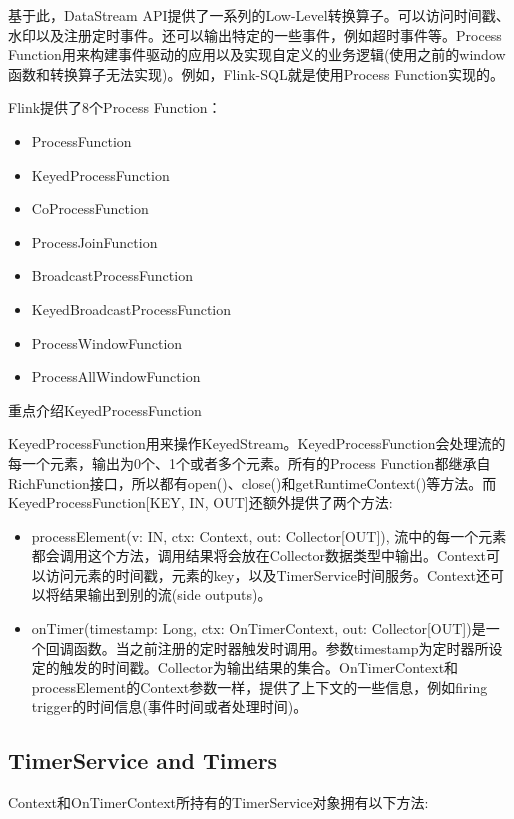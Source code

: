 \documentclass[oneside]{ctexbook}
\begin{document}
基于此，DataStream API提供了一系列的Low-Level转换算子。可以访问时间戳、水印以及注册定时事件。还可以输出特定的一些事件，例如超时事件等。Process Function用来构建事件驱动的应用以及实现自定义的业务逻辑(使用之前的window函数和转换算子无法实现)。例如，Flink-SQL就是使用Process Function实现的。

Flink提供了8个Process Function：

\begin{itemize}
\item ProcessFunction
\item KeyedProcessFunction
\item CoProcessFunction
\item ProcessJoinFunction
\item BroadcastProcessFunction
\item KeyedBroadcastProcessFunction
\item ProcessWindowFunction
\item ProcessAllWindowFunction
\end{itemize}

重点介绍KeyedProcessFunction

KeyedProcessFunction用来操作KeyedStream。KeyedProcessFunction会处理流的每一个元素，输出为0个、1个或者多个元素。所有的Process Function都继承自RichFunction接口，所以都有open()、close()和getRuntimeContext()等方法。而KeyedProcessFunction[KEY, IN, OUT]还额外提供了两个方法:

\begin{itemize}
\item processElement(v: IN, ctx: Context, out: Collector[OUT]), 流中的每一个元素都会调用这个方法，调用结果将会放在Collector数据类型中输出。Context可以访问元素的时间戳，元素的key，以及TimerService时间服务。Context还可以将结果输出到别的流(side outputs)。
\item onTimer(timestamp: Long, ctx: OnTimerContext, out: Collector[OUT])是一个回调函数。当之前注册的定时器触发时调用。参数timestamp为定时器所设定的触发的时间戳。Collector为输出结果的集合。OnTimerContext和processElement的Context参数一样，提供了上下文的一些信息，例如firing trigger的时间信息(事件时间或者处理时间)。
\end{itemize}

\subsection{TimerService and Timers}

Context和OnTimerContext所持有的TimerService对象拥有以下方法:
\end{document}
